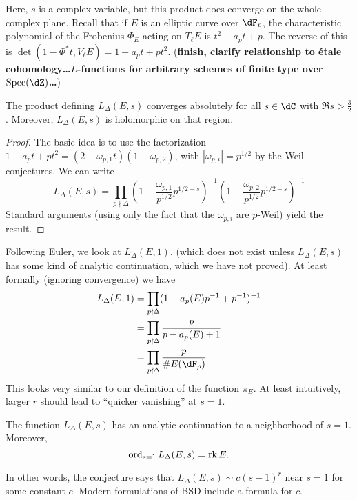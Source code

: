 \documentclass{article}
\begin{document}
Here, $s$ is a complex variable, but this product does converge on the whole 
complex plane. Recall that if $E$ is an elliptic curve over $\dF_p$, the 
characteristic polynomial of the Frobenius $\Phi_E$ acting on $T_\ell E$ is 
$t^2-a_p t + p$. The reverse of this is 
$\det(1-\Phi^\ast t,V_\ell E) = 1-a_p t + p t^2$. (\textbf{finish, clarify 
relationship to \'etale cohomology\ldots $L$-functions for arbitrary schemes 
of finite type over $\spec(\dZ)$\ldots})

\begin{lemma}
The product defining $L_\Delta(E,s)$ converges absolutely for all $s\in \dC$ 
with $\Re s>\frac 3 2$. Moreover, $L_\Delta(E,s)$ is holomorphic on that 
region. 
\end{lemma}
\begin{proof}
The basic idea is to use the factorization 
$1-a_p t + p t^2 = (2-\omega_{p,1} t)(1-\omega_{p,2})$, with 
$|\omega_{p,i}| = p^{1/2}$ by the Weil conjectures. We can write  
\[
  L_\Delta(E,s) = \prod_{p\nmid \Delta} \left(1-\frac{\omega_{p,1}}{p^{1/2}} p^{1/2-s}\right)^{-1}\left( 1-\frac{\omega_{p,2}}{p^{1/2}} p^{1/2-s}\right)^{-1}
\]
Standard arguments (using only the fact that the $\omega_{p,i}$ are $p$-Weil) 
yield the result. 
\end{proof}

Following Euler, we look at $L_\Delta(E,1)$, (which does not exist unless 
$L_\Delta(E,s)$ has some kind of analytic continuation, which we have not 
proved). At least formally (ignoring convergence) we have 
\begin{align*}
  L_\Delta(E,1) &= \prod_{p\nmid \Delta} (1-a_p(E) p^{-1} + p^{-1})^{-1} \\
    &= \prod_{p\nmid \Delta} \frac{p}{p-a_p(E)+1} \\
    &= \prod_{p\nmid \Delta} \frac{p}{\# E(\dF_p)}
\end{align*}
This looks very similar to our definition of the function $\pi_E$. At least 
intuitively, larger $r$ should lead to ``quicker vanishing'' at $s=1$. 

\begin{conjecture}
The function $L_\Delta(E,s)$ has an analytic continuation to a neighborhood of 
$s=1$. Moreover, 
\[
  \operatorname{ord}_{s=1} L_\Delta(E,s) = \operatorname{rk} E \text{.}
\]
\end{conjecture}

In other words, the conjecture says that $L_\Delta(E,s)\sim c(s-1)^r$ near 
$s=1$ for some constant $c$. Modern formulations of BSD include a formula for 
$c$. 
\end{document}
